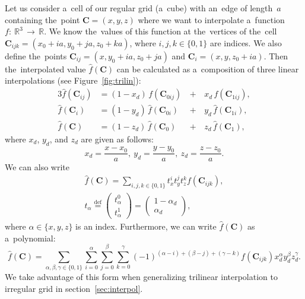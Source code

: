 				Let us consider a~cell of our regular grid (a~cube) with an~edge of length~$a$ containing the~point $\mathbf{C} = (x,y,z)$ where we want to interpolate a~function $f\!\!:~\!\!\mathbb{R}^3\,\to\,\mathbb{R}$. We know the~values of this function at the~vertices of the~cell $\mathbf{C}_{ijk} = (x_0+ia,y_0+ja,z_0+ka)$, where $i,j,k \in \{0,1\}$ are indices. We also define the~points $\mathbf{C}_{ij} = (x,y_0+ia,z_0+ja)$ and $\mathbf{C}_i=(x,y,z_0+ia)$. Then the~interpolated value $\widehat{f}(\mathbf{C})$ can be calculated as a~composition of three linear interpolations (see Figure~\ref{fig:trilin}):
					\begin{alignat}{3}
						\widehat{f}(\mathbf{C}_{ij}) &= (1-x_d)\,f(\mathbf{C}_{0ij}) \,&+&\,x_d\, f(\mathbf{C}_{1ij}),\\
						\widehat{f}(\mathbf{C}_{i}) &= (1-y_d)\,\widehat{f}(\mathbf{C}_{0i}) &+&\,y_d\, \widehat{f}(\mathbf{C}_{1i}),\\
						\widehat{f}(\mathbf{C}) &= (1-z_d)\,\widehat{f}(\mathbf{C}_0) &+&\,z_d\, \widehat{f}(\mathbf{C}_1),
					\end{alignat}
				where $x_d$, $y_d$, and $z_d$ are given as follows:
					\begin{equation}
						x_d = \frac{x-x_0}{a},~y_d = \frac{y-y_0}{a},~z_d = \frac{z-z_0}{a}.
					\end{equation}
				We can also write
					\begin{eqnarray}
						\widehat{f}(\mathbf{C}) = \sum_{i,j,k \in \{0,1\}} t_x^i t_y^j t_z^k f(\mathbf{C}_{ijk}),\\
						t_\alpha \stackrel{\text{def}}{=} \begin{pmatrix}t_\alpha^0\\ t_\alpha^1\end{pmatrix} = \begin{pmatrix}1-\alpha_d\\ \alpha_d\end{pmatrix},
					\end{eqnarray}
				where $\alpha \in \{x,y,z\}$ is an index. Furthermore, we can write $\widehat{f}(\mathbf{C})$ as a~polynomial:
					\begin{equation}
						\label{eq:trilinpoly}
						\widehat{f}(\mathbf{C}) = \sum_{\alpha,\beta,\gamma \in \{0,1\}}\sum^{\alpha}_{i=0}\sum^{\beta}_{j=0}\sum^{\gamma}_{k=0} 	(-1)^{(\alpha-i)+(\beta-j)+(\gamma-k)} f(\mathbf{C}_{ijk}) x_d^\alpha y_d^\beta z_d^\gamma.
					\end{equation}
				We take advantage of this form when generalizing trilinear interpolation to irregular grid in section~\ref{sec:interpol}.
					
